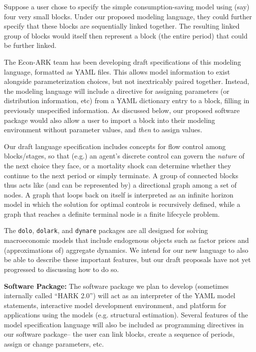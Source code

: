 \documentclass[12pt,pdftex,letterpaper]{article}
\begin{document}
Suppose a user chose to specify the simple consumption-saving model using (say) four very small blocks. Under our proposed modeling language, they could further specify that these blocks are sequentially linked together. The resulting linked group of blocks would itself then represent a block (the entire period) that could be further linked.

The Econ-ARK team has been developing draft specifications of this modeling language, formatted as YAML files. This allows model information to exist alongside parameterization choices, but not inextricably paired together. Instead, the modeling language will include a directive for assigning parameters (or distribution information, etc) from a YAML dictionary entry to a block, filling in previously unspecified information. As discussed below, our proposed software package would also allow a user to import a block into their modeling environment without parameter values, and \textit{then} to assign values.

Our draft language specification includes concepts for flow control among blocks/stages, so that (e.g.) an agent's discrete control can govern the \textit{nature} of the next choice they face, or a mortality shock can determine whether they continue to the next period or simply terminate. A group of connected blocks thus acts like (and can be represented by) a directional graph among a set of nodes. A graph that loops back on itself is interpreted as an infinite horizon model in which the solution for optimal controls is recursively defined, while a graph that reaches a definite terminal node is a finite lifecycle problem. 

The \texttt{dolo}, \texttt{dolark}, and \texttt{dynare} packages are all designed for solving macroeconomic models that include endogenous objects such as factor prices and (approximations of) aggregate dynamics. We intend for our new language to also be able to describe these important features, but our draft proposals have not yet progressed to  discussing how to do so.

\vspace{0.35cm}

\noindent \textbf{Software Package:} The software package we plan to develop (sometimes internally called ``HARK 2.0'') will act as an interpreter of the YAML model statements, interactive model development environment, and platform for applications using the models (e.g. structural estimation). Several features of the model specification language will also be included as programming directives in our software package-- the user can link blocks, create a sequence of periods, assign or change parameters, etc.
\end{document}
